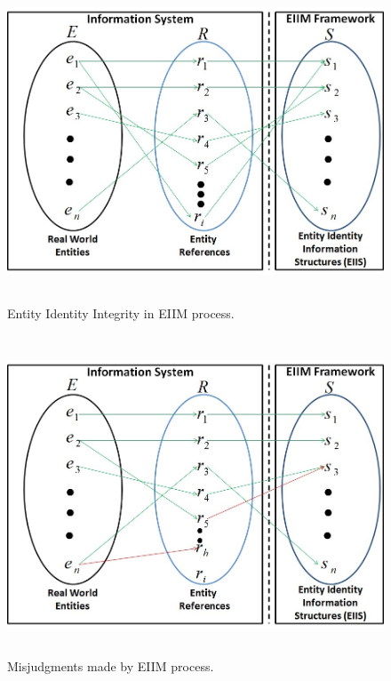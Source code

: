 \begin{figure}[htbp]
  \caption{Entity Identity Integrity in EIIM process.}
\label{identityIntegrity1}
  \centering
    \includegraphics[width=14cm,height=9.5cm]{Figures/identityIntegrityMDM1.jpg}
\end{figure}



\begin{figure}[htbp]
  \caption{Misjudgments made by EIIM process.}
\label{identityIntegrity2}
  \centering
    \includegraphics[width=14cm,height=9.5cm]{Figures/identityIntegrityMDM2.jpg}
\end{figure}


